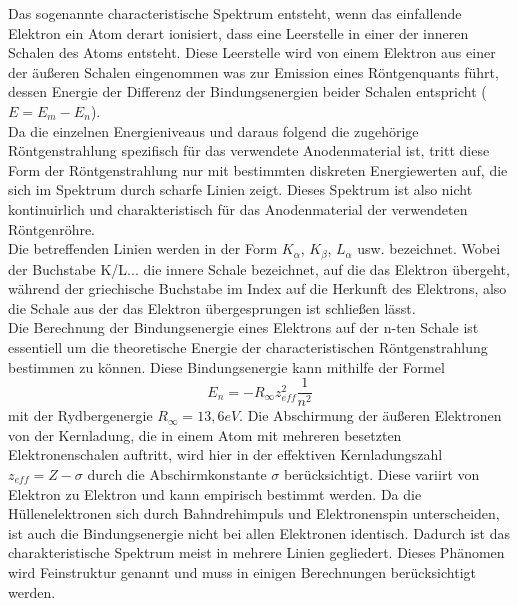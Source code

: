 Das sogenannte characteristische Spektrum entsteht, wenn das einfallende Elektron ein Atom derart ionisiert, dass eine Leerstelle in einer der inneren Schalen des Atoms entsteht. Diese Leerstelle wird von einem Elektron aus einer der äußeren Schalen eingenommen was zur Emission eines Röntgenquants führt, dessen Energie der Differenz der Bindungsenergien beider Schalen entspricht ($E=E_m-E_n$). \\
Da die einzelnen Energieniveaus und daraus folgend die zugehörige Röntgenstrahlung spezifisch für das verwendete Anodenmaterial ist, tritt diese Form der Röntgenstrahlung nur mit bestimmten diskreten Energiewerten auf, die sich im Spektrum durch scharfe Linien zeigt. Dieses Spektrum ist also nicht kontinuirlich und charakteristisch für das Anodenmaterial der verwendeten Röntgenröhre. \\
Die betreffenden Linien werden in der Form $K_\alpha$, $K_\beta$, $L_\alpha$ usw. bezeichnet. Wobei der Buchstabe K/L... die innere Schale bezeichnet, auf die das Elektron übergeht, während der griechische Buchstabe im Index auf die Herkunft des Elektrons, also die Schale aus der das Elektron übergesprungen ist schließen lässt. \\
Die Berechnung der Bindungsenergie eines Elektrons auf der n-ten Schale ist essentiell um die theoretische Energie der characteristischen Röntgenstrahlung bestimmen zu können. Diese Bindungsenergie kann mithilfe der Formel
\begin{equation}
E_n=-R_{\infty}z_{eff}^2\frac{1}{n^2}
\end{equation}
mit der Rydbergenergie $R_{\infty}=13,6 eV$. Die Abschirmung der äußeren Elektronen von der Kernladung, die in einem Atom mit mehreren besetzten Elektronenschalen auftritt, wird hier in der effektiven Kernladungszahl $z_{eff}=Z-\sigma$ durch die Abschirmkonstante $\sigma$ berücksichtigt. Diese variirt von Elektron zu Elektron und kann empirisch bestimmt werden.
Da die Hüllenelektronen sich durch Bahndrehimpuls und Elektronenspin unterscheiden, ist auch die Bindungsenergie nicht bei allen Elektronen identisch. Dadurch ist das charakteristische Spektrum meist in mehrere Linien gegliedert. Dieses Phänomen wird Feinstruktur genannt und muss in einigen Berechnungen berücksichtigt werden.


